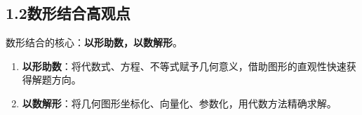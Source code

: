 \documentclass[12pt, a4paper]{ctexart}
\begin{document}
\subsection*{1.2\quad 数形结合高观点}

\begin{knowledgebox}[数形结合思想]
数形结合的核心：\textbf{以形助数，以数解形}。
\begin{enumerate}[label=(\arabic*)]
  \item \textbf{以形助数}：将代数式、方程、不等式赋予几何意义，借助图形的直观性快速获得解题方向。
  \item \textbf{以数解形}：将几何图形坐标化、向量化、参数化，用代数方法精确求解。
\end{enumerate}
\end{knowledgebox}
\end{document}
